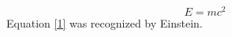 \documentclass{article}
\begin{document}
  \begin{equation}\label{1}
    E=mc^2
  \end{equation}
  Equation \eqref{1} was recognized by Einstein.
\end{document}
